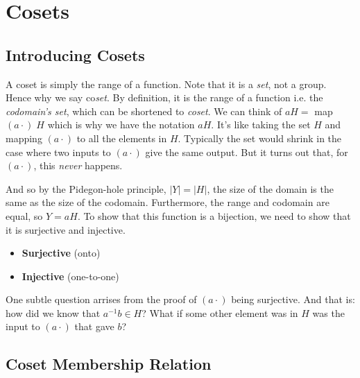 
\chapter{Cosets}



\section{Introducing Cosets}





A coset is simply the range of a function. Note that it is a \textit{set}, 
not a group. Hence why we say co\textit{set}. 
By definition, it is the range of a function i.e. the \textit{codomain's set}, 
which can be shortened to \textit{coset}. 
We can think of $aH = $ map $(a\cdot) \; H$ which is why we have the notation 
$aH$. It's like taking the set $H$ and mapping $(a\cdot)$ to all the elements 
in $H$. Typically the set would shrink in the case where two inputs to $(a\cdot)$ 
give the same output. But it turns out that, for $(a\cdot)$, this \textit{never} happens.  


And so by the Pidegon-hole principle, $|Y| = |H|$, the size of the domain is the same 
as the size of the codomain. Furthermore, the range and codomain are equal, 
so $Y = aH$. To show that this function is a bijection, 
we need to show that it is surjective and injective. 

\begin{itemize}
\item \textbf{Surjective} (onto)
\item \textbf{Injective} (one-to-one)
\end{itemize}

One subtle question arrises from the proof of $(a \cdot)$ being surjective.
And that is: how did we know that $a^{-1}b \in H$? What if some other element 
was in $H$ was the input to $(a \cdot)$ that gave $b$? 


\frmrule



\section{Coset Membership Relation}

